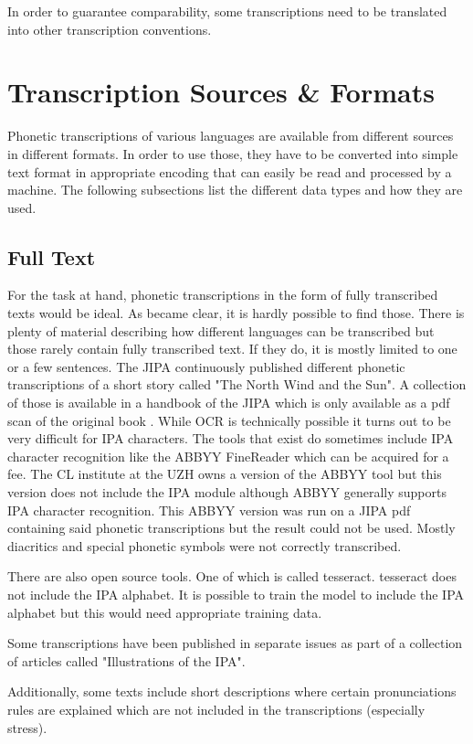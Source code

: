 In order to guarantee comparability, some transcriptions need to be translated into other transcription conventions. 


\section{Transcription Sources \& Formats}
Phonetic transcriptions of various languages are available from different sources in different formats. In order to use those, they have to be converted into simple text format in appropriate encoding that can easily be read and processed by a machine. The following subsections list the different data types and how they are used.

\subsection{Full Text}
For the task at hand, phonetic transcriptions in the form of fully transcribed texts would be ideal. As became clear, it is hardly possible to find those. There is plenty of material describing how different languages can be transcribed but those rarely contain fully transcribed text. If they do, it is mostly limited to one or a few sentences. The JIPA continuously published different phonetic transcriptions of a short story called "The North Wind and the Sun". A collection of those is available in a handbook of the JIPA which is only available as a pdf scan of the original book \citep{JIPA2010}. While OCR is technically possible it turns out to be very difficult for IPA characters. The tools that exist do sometimes include IPA character recognition like the ABBYY FineReader which can be acquired for a fee. The CL institute at the UZH owns a version of the ABBYY tool but this version does not include the IPA module although ABBYY generally supports IPA character recognition. This ABBYY version was run on a JIPA pdf containing said phonetic transcriptions but the result could not be used. Mostly diacritics and special phonetic symbols were not correctly transcribed.

There are also open source tools. One of which is called tesseract. tesseract does not include the IPA alphabet. It is possible to train the model to include the IPA alphabet but this would need appropriate training data. 

Some transcriptions have been published in separate issues as part of a collection of articles called "Illustrations of the IPA".

Additionally, some texts include short descriptions where certain pronunciations rules are explained which are not included in the transcriptions (especially stress). 

